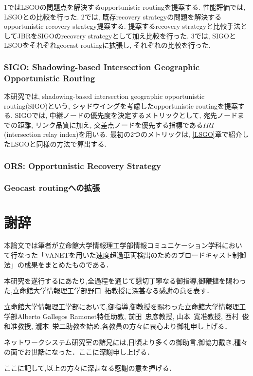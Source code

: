 \documentclass[10pt]{jreport}
\begin{document}
1ではLSGOの問題点を解決するopportunistic routingを提案する. 性能評価では, LSGOとの比較を行った. 2では, 既存recovery strategyの問題を解決するopportunistic recovery strategy提案する. 提案するrecovery strategyと比較手法としてJBRをSIGOのrecovery strategyとして加え比較を行った.
3では, SIGOとLSGOをそれぞれgeocast routingに拡張し, それぞれの比較を行った.

\subsection{SIGO: Shadowing-based Intersection Geographic Opportunistic Routing}

本研究では, shadowing-based intersection geographic opportunistic routing(SIGO)という, シャドウイングを考慮したopportunistic routingを提案する. SIGOでは, 中継ノードの優先度を決定するメトリックとして, 宛先ノードまでの距離, リンク品質に加え, 交差点ノードを優先する指標である$IRI$(intersection relay index)を用いる. 最初の2つのメトリックは, \ref{LSGO}章で紹介したLSGOと同様の方法で算出する.

\subsection{ORS: Opportunistic Recovery Strategy}

\subsection{Geocast routingへの拡張}






\chapter*{謝辞}
\sloppy
本論文では筆者が立命館大学情報理工学部情報コミュニケーション学科におい
て行なった「VANETを用いた速度超過車両検出のためのブロードキャスト制御法」の成果をまとめたものである．

本研究を遂行するにあたり,全過程を通じて懇切丁寧なる御指導,御鞭撻を賜わっ
た,立命館大学情報理工学部野口~拓教授に深甚なる感謝の意を表す．

立命館大学情報理工学部において,御指導,御教授を賜わった立命館大学情報理工学部Alberto Gallegos Ramonet特任助教, 前田~忠彦教授, 山本~寛准教授, 西村~俊和准教授, 瀧本~栄二助教を始め,各教員の方々に衷心より御礼申し上げる．


ネットワークシステム研究室の諸兄には,日頃より多くの御助言,御協力戴き,種々の面でお世話になった．ここに深謝申し上げる．

ここに記して,以上の方々に深甚なる感謝の意を捧げる．





\end{document}
